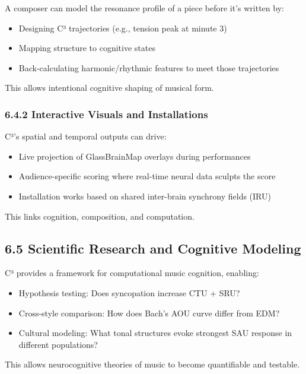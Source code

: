 A composer can model the resonance profile of a piece before it's written by:

\begin{itemize}
    \item Designing C³ trajectories (e.g., tension peak at minute 3)
    \item Mapping structure to cognitive states
    \item Back-calculating harmonic/rhythmic features to meet those trajectories
\end{itemize}

This allows intentional cognitive shaping of musical form.

\subsubsection*{6.4.2 Interactive Visuals and Installations}

C³’s spatial and temporal outputs can drive:

\begin{itemize}
    \item Live projection of GlassBrainMap overlays during performances
    \item Audience-specific scoring where real-time neural data sculpts the score
    \item Installation works based on shared inter-brain synchrony fields (IRU)
\end{itemize}

This links cognition, composition, and computation.

\subsection*{6.5 Scientific Research and Cognitive Modeling}

C³ provides a framework for computational music cognition, enabling:

\begin{itemize}
    \item Hypothesis testing: Does syncopation increase CTU + SRU?
    \item Cross-style comparison: How does Bach’s AOU curve differ from EDM?
    \item Cultural modeling: What tonal structures evoke strongest SAU response in different populations?
\end{itemize}

This allows neurocognitive theories of music to become quantifiable and testable.

